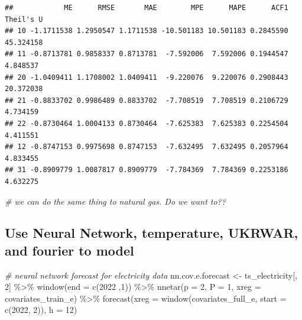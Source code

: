 \documentclass[
]{article}
\newenvironment{Shaded}{\begin{snugshade}}{\end{snugshade}}
\newcommand{\AttributeTok}[1]{\textcolor[rgb]{0.77,0.63,0.00}{#1}}
\newcommand{\CommentTok}[1]{\textcolor[rgb]{0.56,0.35,0.01}{\textit{#1}}}
\newcommand{\DecValTok}[1]{\textcolor[rgb]{0.00,0.00,0.81}{#1}}
\newcommand{\FunctionTok}[1]{\textcolor[rgb]{0.00,0.00,0.00}{#1}}
\newcommand{\NormalTok}[1]{#1}
\newcommand{\OtherTok}[1]{\textcolor[rgb]{0.56,0.35,0.01}{#1}}
\newcommand{\SpecialCharTok}[1]{\textcolor[rgb]{0.00,0.00,0.00}{#1}}
\begin{document}
\begin{verbatim}
##            ME      RMSE       MAE        MPE      MAPE      ACF1 Theil's U
## 10 -1.1711538 1.2950547 1.1711538 -10.501183 10.501183 0.2845590 45.324158
## 11 -0.8713781 0.9858337 0.8713781  -7.592006  7.592006 0.1944547  4.848537
## 20 -1.0409411 1.1708002 1.0409411  -9.220076  9.220076 0.2908443 20.372038
## 21 -0.8833702 0.9986489 0.8833702  -7.708519  7.708519 0.2106729  4.734159
## 22 -0.8730464 1.0004133 0.8730464  -7.625383  7.625383 0.2254504  4.411551
## 12 -0.8747153 0.9975698 0.8747153  -7.632495  7.632495 0.2057964  4.833455
## 31 -0.8909779 1.0087817 0.8909779  -7.784369  7.784369 0.2253186  4.632275
\end{verbatim}

\begin{Shaded}
\begin{Highlighting}[]
\CommentTok{\# we can do the same thing to natural gas. Do we want to??}
\end{Highlighting}
\end{Shaded}

\hypertarget{use-neural-network-temperature-ukrwar-and-fourier-to-model}{%
\subsection{Use Neural Network, temperature, UKRWAR, and fourier to
model}\label{use-neural-network-temperature-ukrwar-and-fourier-to-model}}

\begin{Shaded}
\begin{Highlighting}[]
\CommentTok{\# neural network forecast for electricity data}
\NormalTok{nn.cov.e.forecast }\OtherTok{\textless{}{-}}\NormalTok{ ts\_electricity[, }\DecValTok{2}\NormalTok{] }\SpecialCharTok{\%\textgreater{}\%} 
  \FunctionTok{window}\NormalTok{(}\AttributeTok{end =} \FunctionTok{c}\NormalTok{(}\DecValTok{2022}\NormalTok{ ,}\DecValTok{1}\NormalTok{)) }\SpecialCharTok{\%\textgreater{}\%} 
  \FunctionTok{nnetar}\NormalTok{(}\AttributeTok{p =} \DecValTok{2}\NormalTok{, }\AttributeTok{P =} \DecValTok{1}\NormalTok{,}
         \AttributeTok{xreg =}\NormalTok{ covariates\_train\_e) }\SpecialCharTok{\%\textgreater{}\%} 
  \FunctionTok{forecast}\NormalTok{(}\AttributeTok{xreg =} \FunctionTok{window}\NormalTok{(covariates\_full\_e, }\AttributeTok{start =} \FunctionTok{c}\NormalTok{(}\DecValTok{2022}\NormalTok{, }\DecValTok{2}\NormalTok{)),}
           \AttributeTok{h =} \DecValTok{12}\NormalTok{)}
\end{Highlighting}
\end{Shaded}
\end{document}
